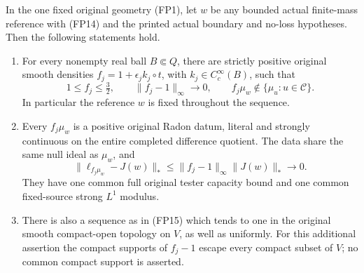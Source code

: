 \begin{theorem}
In the one fixed original geometry (FP1), let $w$ be any bounded
actual finite-mass reference with (FP14) and the printed actual
boundary and no-loss hypotheses. Then the following statements hold.
\begin{enumerate}
\item For every nonempty real ball $B\Subset Q$, there are
strictly positive original smooth densities
$f_j=1+\epsilon_j k_j\circ t$, with $k_j\in C_c^\infty(B)$,
such that
\[
  1\le f_j\le\tfrac32,\qquad
  \|f_j-1\|_\infty\longrightarrow0,
  \qquad f_j\mu_w\notin\{\mu_u:u\in\mathscr C\}.
 \tag{FP15}
\]
In particular the reference $w$ is fixed throughout the sequence.
\item Every $f_j\mu_w$ is a positive original Radon datum,
literal and strongly continuous on the entire completed difference
quotient. The data share the same null ideal as $\mu_w$, and
\[
 \|\ell_{f_j\mu_w}-J(w)\|_*
                   \le\|f_j-1\|_\infty\|J(w)\|_*
                       \longrightarrow0.
 \tag{FP16}
\]
They have one common full original tester capacity bound and one
common fixed-source strong $L^1$ modulus.
\item There is also a sequence as in (FP15) which tends to one
in the original smooth compact-open topology on $V$, as well as
uniformly. For this additional assertion the compact supports of
$f_j-1$ escape every compact subset of $V$; no common compact
support is asserted.
\end{enumerate}
\end{theorem}

